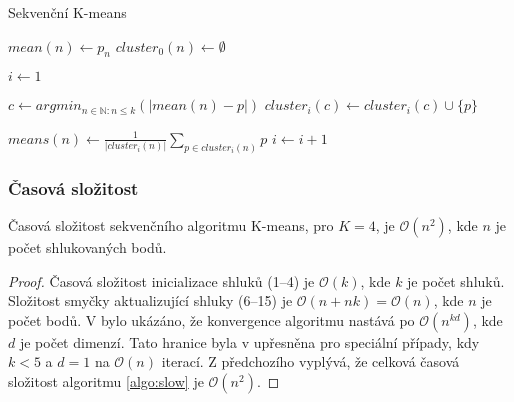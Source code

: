 \documentclass[a4paper, 11pt, fleqn]{scrartcl}
\begin{document}
      \begin{algorithm}[!h]
        \label{algo:slow}
        \SetAlgoLined
        \DontPrintSemicolon
        \caption{Sekvenční K-means}

        \vspace*{2mm}

        {
          $mean(n) \leftarrow p_n$\;
          $cluster_0(n) \leftarrow \emptyset$\;
        }

        \vspace*{2mm}

        $i \leftarrow 1$\;
        {
          {
            $c \leftarrow arg min_{n \in \mathbb{N} : n \leq k}(|mean(n) - p|)$\;
            $cluster_i(c) \leftarrow cluster_i(c) \cup \{p\}$\;
          }

          \vspace*{2mm}

            {
              $means(n) \leftarrow \frac{1}{|cluster_i(n)|} \sum_{p \in cluster_i(n)}p$
            }
          $i \leftarrow i + 1$\;
        }

        \vspace*{2mm}

      \end{algorithm}

      \subsubsection{Časová složitost}
        Časová složitost sekvenčního algoritmu K-means, pro $K = 4$, je $\mathcal{O}(n^2)$, kde $n$ je počet shlukovaných bodů.

        \begin{proof}
          Časová složitost inicializace shluků (1--4) je $\mathcal{O}(k)$, kde $k$ je počet shluků. Složitost smyčky aktualizující shluky (6--15) je $\mathcal{O}(n + nk) = \mathcal{O}(n)$, kde $n$ je počet bodů. V \cite{slow} bylo ukázáno, že konvergence algoritmu nastává po $\mathcal{O}(n^{kd})$, kde $d$ je počet dimenzí. Tato hranice byla v \cite{fast} upřesněna pro speciální případy, kdy $k < 5$ a $d = 1$ na $\mathcal{O}(n)$ iterací. Z předchozího vyplývá, že celková časová složitost algoritmu \ref{algo:slow} je $\mathcal{O}(n^2)$.
        \end{proof}
\end{document}
